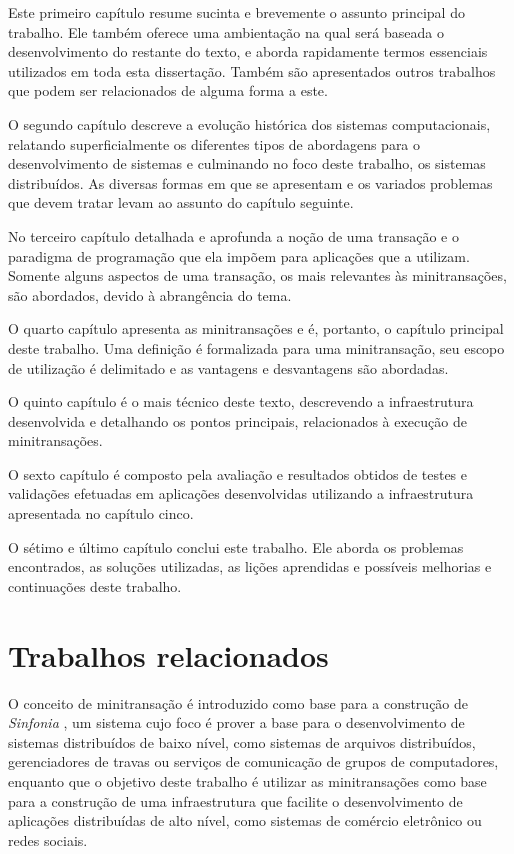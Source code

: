 \documentclass[11pt,twoside,a4paper]{book}
\begin{document}
Este primeiro capítulo resume sucinta e brevemente o assunto principal do trabalho. Ele também oferece uma ambientação na qual será baseada o desenvolvimento do restante do texto, e aborda rapidamente termos essenciais utilizados em toda esta dissertação. Também são apresentados outros trabalhos que podem ser relacionados de alguma forma a este.

O segundo capítulo descreve a evolução histórica dos sistemas computacionais, relatando superficialmente os diferentes tipos de abordagens para o desenvolvimento de sistemas e culminando no foco deste trabalho, os sistemas distribuídos. As diversas formas em que se apresentam e os variados problemas que devem tratar levam ao assunto do capítulo seguinte.

No terceiro capítulo detalhada e aprofunda a noção de uma transação e o paradigma de programação que ela impõem para aplicações que a utilizam. Somente alguns aspectos de uma transação, os mais relevantes às minitransações, são abordados, devido à abrangência do tema.

O quarto capítulo apresenta as minitransações e é, portanto, o capítulo principal deste trabalho. Uma definição é formalizada para uma minitransação, seu escopo de utilização é delimitado e as vantagens e desvantagens são abordadas.

O quinto capítulo é o mais técnico deste texto, descrevendo a infraestrutura desenvolvida e detalhando os pontos principais, relacionados à execução de minitransações.

O sexto capítulo é composto pela avaliação e resultados obtidos de testes e validações efetuadas em aplicações desenvolvidas utilizando a infraestrutura apresentada no capítulo cinco.

O sétimo e último capítulo conclui este trabalho. Ele aborda os problemas encontrados, as soluções utilizadas, as lições aprendidas e possíveis melhorias e continuações deste trabalho.

\section{Trabalhos relacionados}
\label{sec:trabalhos_relacionados}
O conceito de minitransação é introduzido como base para a construção de \emph{Sinfonia} \cite{sinfonia}, um sistema cujo foco é prover a base para o desenvolvimento de sistemas distribuídos de baixo nível, como sistemas de arquivos distribuídos, gerenciadores de travas ou serviços de comunicação de grupos de computadores, enquanto que o objetivo deste trabalho é utilizar as minitransações como base para a construção de uma infraestrutura que facilite o desenvolvimento de aplicações distribuídas de alto nível, como sistemas de comércio eletrônico ou redes sociais.
\end{document}
